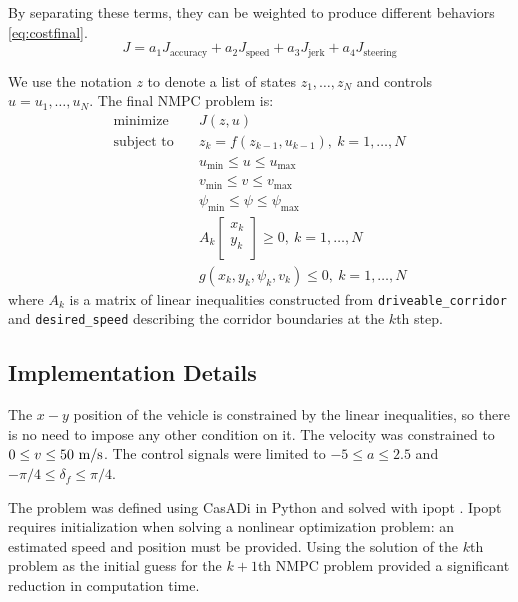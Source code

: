 \documentclass[letterpaper, 10 pt, conference]{ieeeconf}  %
\begin{document}
 By separating these terms, they can be weighted to produce different behaviors \eqref{eq:costfinal}.
 \begin{equation}
 J = a_1 J_{\text{accuracy}} + a_2 J_{\text{speed}} + a_3 J_{\text{jerk}} + a_4 J_{\text{steering}}
 \label{eq:costfinal}
 \end{equation}
 
 We use the notation $z$ to denote a list of states $z_1,\dots,z_N$ and controls $u=u_1,\dots,u_N$.
 The final NMPC problem is:
 \begin{align}
 \text{minimize}\quad& J(z, u)
 \\
 \text{subject to} \quad& z_{k} = f(z_{k-1}, u_{k-1}),\ k=1,\dots,N
 \\
 & u_{\min} \leq u \leq u_{\max}
 \\
 & v_{\min} \leq v \leq v_{\max}
 \\
 & \psi_{\min} \leq \psi \leq \psi_{\max}
 \\
 &
 A_k\begin{bmatrix}
 x_k\\y_k\\
 \end{bmatrix} \geq 0,\ k=1,\dots,N
 \\
 &
g(x_k, y_k, \psi_k, v_k) \leq 0,\ k=1,\dots,N
 \end{align}
 where $A_k$ is a matrix of linear inequalities constructed from \texttt{driveable\_corridor} and \texttt{desired\_speed} describing the corridor boundaries at the $k$th step.
 
 
 \subsection{Implementation Details}
The $x-y$ position of the vehicle is constrained by the linear inequalities, so there is no need to impose any other condition on it. The velocity was constrained to $0 \leq v \leq 50\ \text{m}/\text{s}$.
The control signals were limited to $-5 \leq a \leq 2.5$ and $-\pi/4 \leq \delta_f \leq \pi/4$.
 
 The problem was defined using CasADi in Python and solved with ipopt \cite{Casadi} \cite{ipopt}. Ipopt requires initialization when solving a nonlinear optimization problem: an estimated speed and position must be provided. Using the solution of the $k$th problem as the initial guess for the $k+1$th NMPC problem provided a significant reduction in computation time.
 
\end{document}
